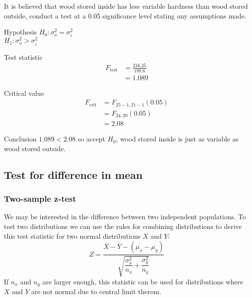         \begin{example}
        {
            It is believed that wood stored inside has less variable hardness than wood stored outside, conduct a test at a 0.05 significance level stating any assumptions made.
        }

        \begin{step}{Hypothesis}
        $H_0: \sigma_o^2 = \sigma_i^2$\\ 
        $H_1: \sigma_o^2 > \sigma_i^2$
        \end{step}

        \begin{step}{Test statistic}
        \begin{align*} 
        F_{\text{test}} &= \frac{216.25}{198.6}\\ 
        &= 1.089 
        \end{align*}
        \end{step}

        \begin{step}{Critical value}
        \begin{align*} 
        F_{\text{crit}} &= F_{25-1, 21-1}(0.05)\\ 
        &= F_{24, 20}(0.05)\\ 
        &= 2.08 
        \end{align*}
        \end{step}

        \begin{step}{Conclusion}
        $1.089 < 2.08$ so accept $H_0$, wood stored inside is just as variable as wood stored outside.
        \end{step}

        \end{example}


    \subsection{Test for difference in mean}

        \subsubsection{Two-sample z-test}
            We may be interested in the difference between two independent populations. To test two distributions we can use the rules for combining distributions to derive this test statistic for two normal distributions $X$ and $Y$: 
            $$Z = \frac{\bar{X} - \bar{Y} - (\mu_x - \mu_y)} {\sqrt{\dfrac{\sigma_x^2}{n_x}+\dfrac{\sigma_y^2}{n_y}}} $$
            If $n_x$ and $n_y$ are larger enough, this statistic can be used for distributions where $X$ and $Y$ are not normal due to central limit therom.

